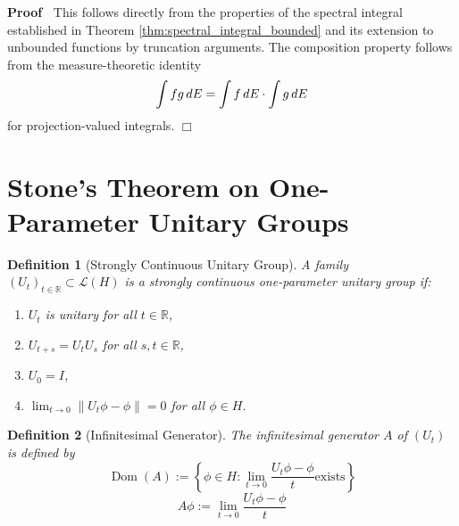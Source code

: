 \documentclass{article}
\newcommand{\assign}{:=}
\newcommand{\tmem}[1]{{\em #1\/}}
\newcommand{\tmop}[1]{\ensuremath{\operatorname{#1}}}
\newenvironment{proof}{\noindent\textbf{Proof\ }}{\hspace*{\fill}$\Box$\medskip}
\newtheorem{definition}{Definition}
\newcommand{\R}{\mathbb{R}}
\newcommand{\1}{\mathbbm{1}}
\newcommand{\norm}[1]{\left\lVert #1  \right\rVert}
\newcommand{\Dom}{\tmop{Dom}}
\begin{document}
\begin{proof}
  This follows directly from the properties of the spectral integral
  established in Theorem \ref{thm:spectral_integral_bounded} and its extension
  to unbounded functions by truncation arguments. The composition property
  follows from the measure-theoretic identity
  \begin{equation}
    \int fg \hspace{0.17em} dE = \int f \hspace{0.17em} dE \cdot \int g
    \hspace{0.17em} dE
  \end{equation}
  for projection-valued integrals.
\end{proof}

\section{Stone's Theorem on One-Parameter Unitary Groups}

\begin{definition}
  [Strongly Continuous Unitary Group] A family $(U_t)_{t \in \R} \subset
  \mathcal{L} (H)$ is a {\tmem{strongly continuous one-parameter unitary
  group}} if:
  \begin{enumerate}
    \item $U_t$ is unitary for all $t \in \R$,
    
    \item $U_{t + s} = U_t U_s$ for all $s, t \in \R$,
    
    \item $U_0 = I$,
    
    \item $\lim_{t \to 0} \norm{U_t \phi - \phi} = 0$ for all $\phi \in H$.
  \end{enumerate}
\end{definition}

\begin{definition}
  [Infinitesimal Generator] The {\tmem{infinitesimal generator}} $A$ of
  $(U_t)$ is defined by
  \begin{equation}
    \Dom (A) \assign \left\{ \phi \in H : \lim_{t \to 0}  \frac{U_t \phi -
    \phi}{t} \text{exists} \right\} \text{}
  \end{equation}
  \begin{equation}
    A \phi \assign \lim_{t \to 0}  \frac{U_t \phi - \phi}{t}
  \end{equation}
\end{definition}
\end{document}

